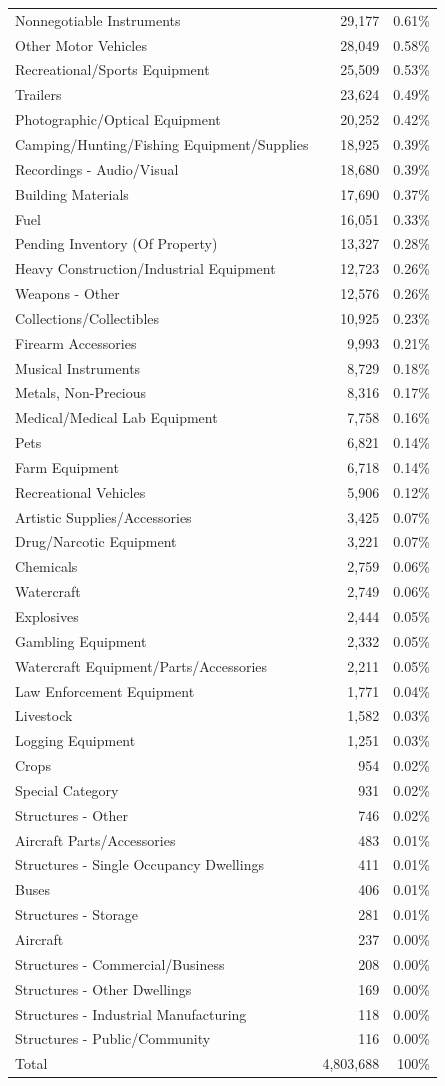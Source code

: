 \documentclass[
  12pt,
  openany]{book}
\begin{document}
\begin{longtable}[]{@{}lrr@{}}
Nonnegotiable Instruments & 29,177 & 0.61\%\tabularnewline
Other Motor Vehicles & 28,049 & 0.58\%\tabularnewline
Recreational/Sports Equipment & 25,509 & 0.53\%\tabularnewline
Trailers & 23,624 & 0.49\%\tabularnewline
Photographic/Optical Equipment & 20,252 & 0.42\%\tabularnewline
Camping/Hunting/Fishing Equipment/Supplies & 18,925 & 0.39\%\tabularnewline
Recordings - Audio/Visual & 18,680 & 0.39\%\tabularnewline
Building Materials & 17,690 & 0.37\%\tabularnewline
Fuel & 16,051 & 0.33\%\tabularnewline
Pending Inventory (Of Property) & 13,327 & 0.28\%\tabularnewline
Heavy Construction/Industrial Equipment & 12,723 & 0.26\%\tabularnewline
Weapons - Other & 12,576 & 0.26\%\tabularnewline
Collections/Collectibles & 10,925 & 0.23\%\tabularnewline
Firearm Accessories & 9,993 & 0.21\%\tabularnewline
Musical Instruments & 8,729 & 0.18\%\tabularnewline
Metals, Non-Precious & 8,316 & 0.17\%\tabularnewline
Medical/Medical Lab Equipment & 7,758 & 0.16\%\tabularnewline
Pets & 6,821 & 0.14\%\tabularnewline
Farm Equipment & 6,718 & 0.14\%\tabularnewline
Recreational Vehicles & 5,906 & 0.12\%\tabularnewline
Artistic Supplies/Accessories & 3,425 & 0.07\%\tabularnewline
Drug/Narcotic Equipment & 3,221 & 0.07\%\tabularnewline
Chemicals & 2,759 & 0.06\%\tabularnewline
Watercraft & 2,749 & 0.06\%\tabularnewline
Explosives & 2,444 & 0.05\%\tabularnewline
Gambling Equipment & 2,332 & 0.05\%\tabularnewline
Watercraft Equipment/Parts/Accessories & 2,211 & 0.05\%\tabularnewline
Law Enforcement Equipment & 1,771 & 0.04\%\tabularnewline
Livestock & 1,582 & 0.03\%\tabularnewline
Logging Equipment & 1,251 & 0.03\%\tabularnewline
Crops & 954 & 0.02\%\tabularnewline
Special Category & 931 & 0.02\%\tabularnewline
Structures - Other & 746 & 0.02\%\tabularnewline
Aircraft Parts/Accessories & 483 & 0.01\%\tabularnewline
Structures - Single Occupancy Dwellings & 411 & 0.01\%\tabularnewline
Buses & 406 & 0.01\%\tabularnewline
Structures - Storage & 281 & 0.01\%\tabularnewline
Aircraft & 237 & 0.00\%\tabularnewline
Structures - Commercial/Business & 208 & 0.00\%\tabularnewline
Structures - Other Dwellings & 169 & 0.00\%\tabularnewline
Structures - Industrial Manufacturing & 118 & 0.00\%\tabularnewline
Structures - Public/Community & 116 & 0.00\%\tabularnewline
Total & 4,803,688 & 100\%\tabularnewline
\bottomrule
\end{longtable}
\end{document}
